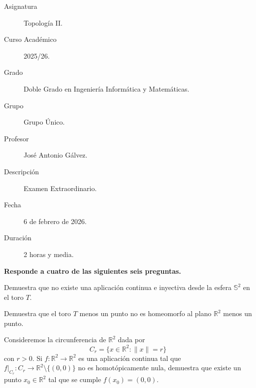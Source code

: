 \documentclass[12pt]{article}
\begin{document}

    
    

    \begin{description}
        \item[Asignatura] Topología II.
        \item[Curso Académico] 2025/26.
        \item[Grado] Doble Grado en Ingeniería Informática y Matemáticas.
        \item[Grupo] Grupo Único.
        \item[Profesor] José Antonio Gálvez.
        \item[Descripción] Examen Extraordinario.
        \item[Fecha] 6 de febrero de 2026.
        \item[Duración] 2 horas y media.
    \end{description}
    \newpage



    \noindent
    \textbf{Responde a cuatro de las siguientes seis preguntas.}

    \begin{ejercicio}
        Demuestra que no existe una aplicación continua e inyectiva desde la esfera $\mathbb{S}^2$ en el toro $T$.
    \end{ejercicio}

    \begin{ejercicio}
        Demuestra que el toro $T$ menos un punto no es homeomorfo al plano $\mathbb{R}^2$ menos un punto.
    \end{ejercicio}

    \begin{ejercicio}
        Consideremos la circunferencia de $\mathbb{R}^2$ dada por
        \begin{equation*}
            C_r = \{x\in \mathbb{R}^2 : \|x\| = r\}
        \end{equation*}
        con $r>0$. Si $f:\mathbb{R}^2\to \mathbb{R}^2$ es una aplicación continua tal que $f\big|_{C_r}:C_r\to \mathbb{R}^2\setminus \{(0,0)\}$ no es homotópicamente nula, demuestra que existe un punto $x_0\in \mathbb{R}^2$ tal que se cumple $f(x_0) = (0,0)$.
    \end{ejercicio}
\end{document}
